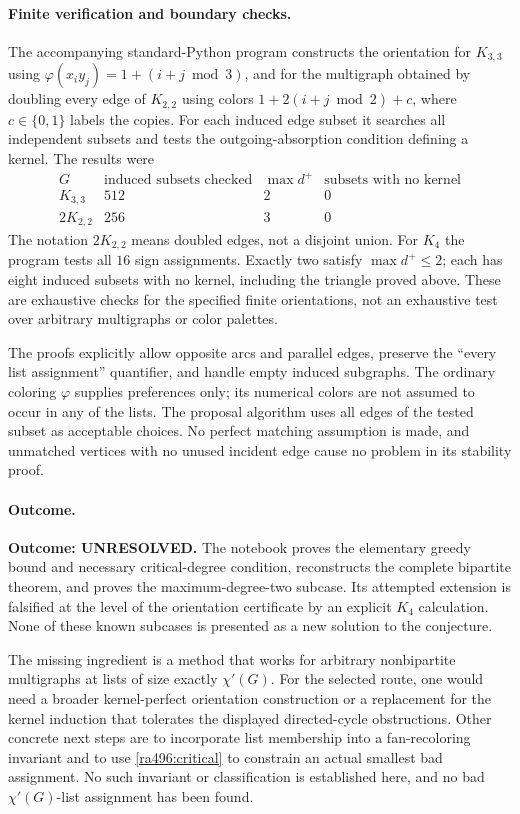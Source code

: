 \documentclass[11pt]{article}
\begin{document}
\paragraph{Finite verification and boundary checks.}
The accompanying standard-Python program constructs the orientation for
$K_{3,3}$ using $\varphi(x_i y_j)=1+(i+j\bmod3)$, and for the
multigraph obtained by doubling every edge of $K_{2,2}$ using colors
$1+2(i+j\bmod2)+c$, where $c\in\{0,1\}$ labels the copies. For each
induced edge subset it searches all independent subsets and tests the
outgoing-absorption condition defining a kernel. The results were
\[
\begin{array}{c|r|r|r}
 G&\text{induced subsets checked}&\max d^+&
       \text{subsets with no kernel}\\ \hline
 K_{3,3}&512&2&0\\
 2K_{2,2}&256&3&0
\end{array}
\]
The notation $2K_{2,2}$ means doubled edges, not a disjoint union.
For $K_4$ the program tests all $16$ sign assignments. Exactly two
satisfy $\max d^+\leq2$; each has eight induced subsets with no kernel,
including the triangle proved above. These are exhaustive checks for the
specified finite orientations, not an exhaustive test over arbitrary
multigraphs or color palettes.

The proofs explicitly allow opposite arcs and parallel edges, preserve
the ``every list assignment'' quantifier, and handle empty induced
subgraphs. The ordinary coloring $\varphi$ supplies preferences only;
its numerical colors are not assumed to occur in any of the lists.
The proposal algorithm uses all edges of the tested subset as acceptable
choices. No perfect matching assumption is made, and unmatched vertices
with no unused incident edge cause no problem in its stability proof.

\paragraph{Outcome.}
\textbf{Outcome: UNRESOLVED.} The notebook proves the elementary greedy
bound and necessary critical-degree condition, reconstructs the complete
bipartite theorem, and proves the maximum-degree-two subcase. Its attempted
extension is falsified at the level of the orientation certificate by
an explicit $K_4$ calculation. None of these known subcases is presented
as a new solution to the conjecture.

The missing ingredient is a method that works for arbitrary nonbipartite
multigraphs at lists of size exactly $\chi'(G)$. For the selected route,
one would need a broader kernel-perfect orientation construction or a
replacement for the kernel induction that tolerates the displayed
directed-cycle obstructions. Other concrete next steps are to incorporate
list membership into a fan-recoloring invariant and to use
\eqref{ra496:critical} to constrain an actual smallest bad assignment.
No such invariant or classification is established here, and no bad
$\chi'(G)$-list assignment has been found.
\end{document}

